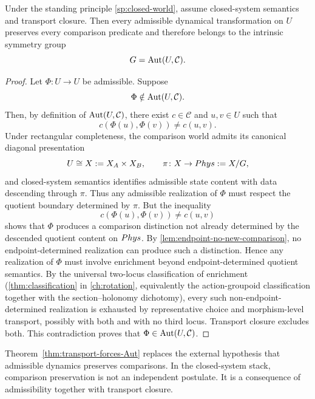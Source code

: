 \begin{theorem}
	\label{thm:transport-forces-Aut}
	Under the standing principle \cref{sp:closed-world}, assume
	closed-system semantics and transport closure.  Then every
	admissible dynamical transformation on \(U\) preserves every comparison
	predicate and therefore belongs to the intrinsic symmetry group
	\[
		G=\operatorname{Aut}(U,\mathcal C).
	\]
\end{theorem}
\begin{proof}
	Let \(\Phi\colon U\to U\) be admissible.  Suppose
	\[
		\Phi\notin \operatorname{Aut}(U,\mathcal C).
	\]
	Then, by definition of \(\operatorname{Aut}(U,\mathcal C)\), there exist
	\(c\in\mathcal C\) and \(u,v\in U\) such that
	\[
		c(\Phi(u),\Phi(v))\neq c(u,v).
	\]
	Under rectangular completeness, the comparison world admits its
	canonical diagonal presentation
	\[
		U\cong X:=X_A\times X_B,
		\qquad
		\pi\colon X\to Phys:=X/G,
	\]
	and closed-system semantics identifies admissible state content with
	data descending through \(\pi\).  Thus any admissible realization of
	\(\Phi\) must respect the quotient boundary determined by \(\pi\).
	But the inequality
	\[
		c(\Phi(u),\Phi(v))\neq c(u,v)
	\]
	shows that \(\Phi\) produces a comparison distinction not already
	determined by the descended quotient content on \(Phys\).  By
	\cref{lem:endpoint-no-new-comparison}, no endpoint-determined
	realization can produce such a distinction.  Hence any realization of
	\(\Phi\) must involve enrichment beyond endpoint-determined quotient
	semantics.
	By the universal two-locus classification of enrichment
	(\cref{thm:classification} in \cref{ch:rotation}, equivalently the
	action-groupoid classification together with the section--holonomy
	dichotomy), every such non-endpoint-determined realization is
	exhausted by representative choice and morphism-level transport,
	possibly with both and with no third locus.
	Transport closure excludes both.  This contradiction proves that
	\(\Phi\in\operatorname{Aut}(U,\mathcal C)\).
\end{proof}
\begin{remark}
	Theorem~\ref{thm:transport-forces-Aut} replaces the external hypothesis
	that admissible dynamics preserves comparisons.  In the closed-system
	stack, comparison preservation is not an independent postulate.  It is
	a consequence of admissibility together with transport closure.
\end{remark}
